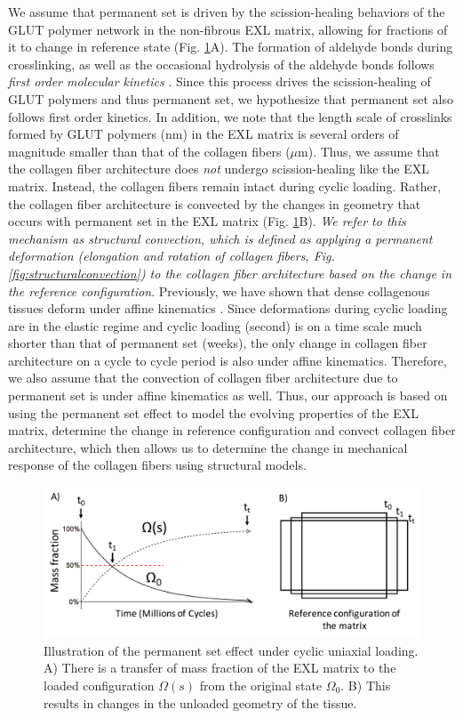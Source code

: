 	We assume that permanent set is driven by the scission-healing behaviors of the GLUT polymer network in the non-fibrous EXL matrix, allowing for fractions of it to change in reference state (Fig. \ref{fig:PS}A). The formation of aldehyde bonds during crosslinking, as well as the occasional hydrolysis of the aldehyde bonds follows \emph{first order molecular kinetics} \cite{migneault_glutaraldehyde_2004}. Since this process drives the scission-healing of GLUT polymers and thus permanent set, we hypothesize that permanent set also follows first order kinetics. In addition, we note that the length scale of crosslinks formed by GLUT polymers ($\mathrm{nm}$) in the EXL matrix is several orders of magnitude smaller than that of the collagen fibers ($\mu \mathrm{m}$). Thus, we assume that the collagen fiber architecture does \emph{not} undergo scission-healing like the EXL matrix. Instead, the collagen fibers remain intact during cyclic loading. Rather, the collagen fiber architecture is convected by the changes in geometry that occurs with permanent set in the EXL matrix (Fig. \ref{fig:PS}B). \emph{We refer to this mechanism as structural convection, which is defined as applying a permanent deformation (elongation and rotation of collagen fibers, Fig. \ref{fig:structuralconvection}) to the collagen fiber architecture based on the change in the reference configuration}. Previously, we have shown that dense collagenous tissues deform under affine kinematics \cite{lee_presence_2015}. Since deformations during cyclic loading are in the elastic regime and cyclic loading (second) is on a time scale much shorter than that of permanent set (weeks), the only change in collagen fiber architecture on a cycle to cycle period is also under affine kinematics. Therefore, we also assume that the convection of collagen fiber architecture due to permanent set is under affine kinematics as well. Thus, our approach is based on using the permanent set effect to model the evolving properties of the EXL matrix, determine the change in reference configuration and convect collagen fiber architecture, which then allows us to determine the change in mechanical response of the collagen fibers using structural models. 


\begin{figure}[hbt]
\centering
\includegraphics[width=\textwidth]{Images/chapter4/figure3}
\caption{Illustration of the permanent set effect under cyclic uniaxial loading. A) There is a transfer of mass fraction of the EXL matrix to the loaded configuration $\Omega(s)$ from the original state $\Omega_0$. B) This results in changes in the unloaded geometry of the tissue.}
\label{fig:PS}
\end{figure}


